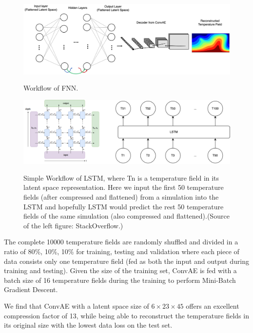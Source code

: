 \begin{figure}[H]
    \centering
    \caption{Workflow of FNN.}
    \includegraphics[scale=0.35]{figures/mantle_convection_images/FNN_workflow.png}
    \label{figure:FNN_workflow}
\end{figure}

\begin{figure}[H]
    \centering
    \caption{Simple Workflow of LSTM, where Tn is a temperature field in its latent space representation. Here we input the first 50 temperature fields (after compressed and flattened) from a simulation into the LSTM and hopefully LSTM would predict the rest 50 temperature fields of the same simulation (also compressed and flattened).(Source of the left figure: StackOverflow.)}
    \includegraphics[scale=0.6]{figures/mantle_convection_images/LSTM_workflow.png}
    \label{figure:LSTM_workflow}
\end{figure}

The complete 10000 temperature fields are randomly shuffled and divided in a ratio of 80\%, 10\%, 10\% for training, testing and validation where each piece of data consists only one temperature field (fed as both the input and output during training and testing). Given the size of the training set, ConvAE is fed with a batch size of 16 temperature fields during the training to perform Mini-Batch Gradient Descent.

We find that ConvAE with a latent space size of $6 \times 23 \times 45$ offers an excellent compression factor of 13, while being able to reconstruct the temperature fields in its original size with the lowest data loss on the test set.

